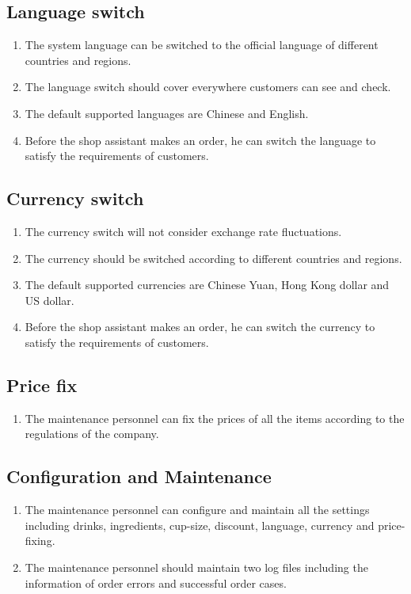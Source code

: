 \documentclass[a4paper]{report}
\begin{document}
\subsection{Language switch}
\begin{enumerate}
\item The system language can be switched to the official language of different countries and regions.
\item The language switch should cover everywhere customers can see and check.
\item The default supported languages are Chinese and English.
\item Before the shop assistant makes an order, he can switch the language to satisfy the requirements of customers.
\end{enumerate}

\subsection{Currency switch}
\begin{enumerate}
\item The currency switch will not consider exchange rate fluctuations.
\item The currency should be switched according to different countries and regions.
\item The default supported currencies are Chinese Yuan, Hong Kong dollar and US dollar.
\item  Before the shop assistant makes an order, he can switch the currency to satisfy the requirements of customers.
\end{enumerate}

\subsection{Price fix}
\begin{enumerate}
\item The maintenance personnel can fix the prices of all the items according to the regulations of the company.
\end{enumerate}

\subsection{Configuration and Maintenance}
\begin{enumerate}
\item The maintenance personnel can configure and maintain all the settings including drinks, ingredients, cup-size, discount, language, currency and price-fixing.
\item The maintenance personnel should maintain two log files including the information of order errors and successful order cases.
\end{enumerate}
\end{document}
